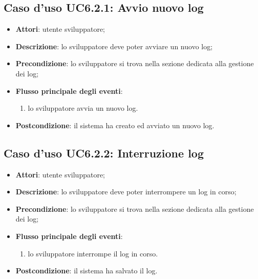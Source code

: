 \documentclass[../AnalisiDeiRequisiti.tex]{subfiles}
\begin{document}
\subsection{Caso d'uso UC6.2.1: Avvio nuovo log}
\begin{itemize}
	\item \textbf{Attori}: utente sviluppatore;
	\item \textbf{Descrizione}: lo sviluppatore deve poter avviare un nuovo log; 
	\item \textbf{Precondizione}: lo sviluppatore si trova nella sezione dedicata alla gestione dei log;
	
	\item \textbf{Flusso principale degli eventi}:
	\begin{enumerate}
		\item lo sviluppatore avvia un nuovo log.
		
	\end{enumerate}
	\item \textbf{Postcondizione}: il sistema ha creato ed avviato un nuovo log.
\end{itemize}
\hypertarget{UC6.2.2}{}
\subsection{Caso d'uso UC6.2.2: Interruzione log}
\begin{itemize}
	\item \textbf{Attori}: utente sviluppatore;
	\item \textbf{Descrizione}: lo sviluppatore deve poter interrompere un log in corso; 
	\item \textbf{Precondizione}: lo sviluppatore si trova nella sezione dedicata alla gestione dei log;
	
	\item \textbf{Flusso principale degli eventi}:
	\begin{enumerate}
		\item lo sviluppatore interrompe il log in corso.
		
	\end{enumerate}
	\item \textbf{Postcondizione}: il sistema ha salvato il log.
\end{itemize}
\hypertarget{UC6.2.3}{}
\end{document}

